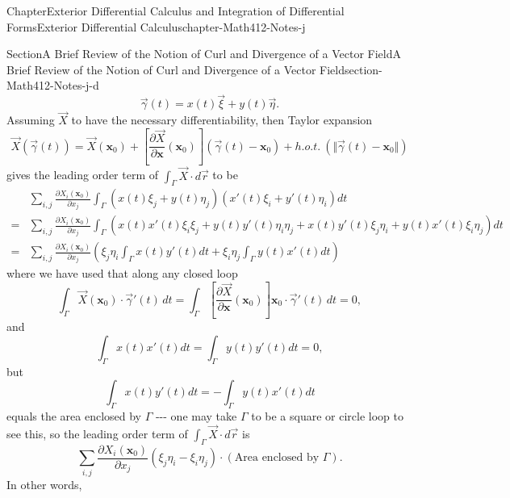 \documentclass[oneside,10pt,]{book}
\numberwithin{equation}{section}
\newcommand{\amp}{&}
\begin{document}
\begin{chapterptx}{Chapter}{Exterior Differential Calculus and Integration of Differential Forms}{}{Exterior Differential Calculus}{}{}{chapter-Math412-Notes-j}
\begin{sectionptx}{Section}{A Brief Review of the Notion of Curl and Divergence of a Vector Field}{}{A Brief Review of the Notion of Curl and Divergence of a Vector Field}{}{}{section-Math412-Notes-j-d}
\begin{equation*}
\vec{\gamma}(t)=x(t)\vec{\xi} + y(t)\vec{\eta}.
\end{equation*}
Assuming \(\vec{X}\) to have the necessary differentiability, then Taylor expansion%
\begin{equation*}
\vec{X}(\vec{\gamma}(t))= \vec{X}({\mathbf x}_{0})+
\left[\frac{\partial \vec{X}}{\partial {\mathbf x}}({\mathbf x}_{0})\right]( \vec{\gamma}(t)- {\mathbf x}_{0})+ 
h.o.t.\ (\Vert \vec{\gamma}(t)- {\mathbf x}_{0}\Vert )
\end{equation*}
gives the leading order term of \(\int_{\Gamma} \vec{X}\cdot d\vec{r}\) to be%
\begin{align*}
\amp \sum_{i,j} \frac{\partial X_i({\mathbf x}_0)}{\partial x_j} \int_{\Gamma} \left(x(t)\xi_j + y(t)\eta_j\right)
\left(x'(t)\xi_i +y'(t)\eta_i\right)dt \\
= \amp \sum_{i,j} \frac{\partial X_i({\mathbf x}_0)}{\partial x_j} \int_{\Gamma} \left(x(t)x'(t)\xi_i\xi_j +
y(t)y'(t)\eta_i\eta_j + x(t)y'(t)\xi_j\eta_i +y(t)x'(t)\xi_i\eta_j\right)dt\\
= \amp \sum_{i,j} \frac{\partial X_i({\mathbf x}_0)}{\partial x_j}\left(\xi_j\eta_i \int_{\Gamma} x(t)y'(t)dt + 
\xi_i\eta_j  \int_{\Gamma} y(t)x'(t) dt\right)
\end{align*}
where we have used that along any closed loop%
\begin{equation*}
\int_{\Gamma} \vec{X}({\mathbf x}_{0})\cdot \vec{\gamma}'(t)\, dt=
\int_{\Gamma} \left[\frac{\partial \vec{X}}{\partial {\mathbf x}}({\mathbf x}_{0})\right] {\mathbf x}_{0}\cdot 
\vec{\gamma}'(t)\, dt=0,
\end{equation*}
and%
\begin{equation*}
\int_{\Gamma} x(t)x'(t) dt = \int_{\Gamma}  y(t)y'(t) dt =0,
\end{equation*}
but%
\begin{equation*}
\int_{\Gamma} x(t)y'(t)dt = -  \int_{\Gamma} y(t)x'(t) dt
\end{equation*}
equals the area enclosed by \(\Gamma\) -{}-{}- one may take \(\Gamma\) to be a square or circle loop to see this, so the leading order term of \(\int_{\Gamma} \vec{X}\cdot d\vec{r}\) is%
\begin{equation*}
\sum_{i,j} \frac{\partial X_i({\mathbf x}_{0})}{\partial x_j} \left(\xi_j\eta_i - \xi_i\eta_j  \right)\cdot
\left(\mbox{Area enclosed by } \Gamma \right).
\end{equation*}
In other words,%
\begin{equation*}

\end{equation*}
\end{sectionptx}
\end{chapterptx}
\end{document}
